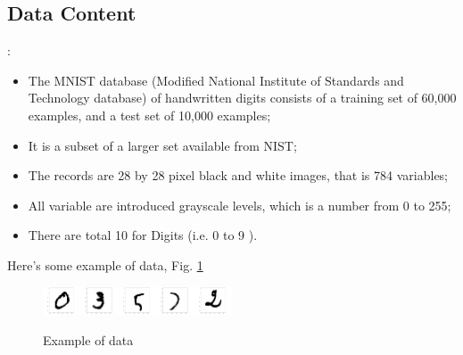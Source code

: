 \documentclass[8pt]{beamer}
\begin{document}
\subsection{Data Content}
\begin{frame}{\secname : \subsecname}
\begin{itemize}
  \item The MNIST database (Modified National Institute of Standards and Technology database) of handwritten digits consists of a training set of 60,000 examples, and a test set of 10,000 examples;
  \item It is a subset of a larger set available from NIST;
  \item The records are 28 by 28 pixel black and white images, that is 784 variables;
  \item All variable are introduced grayscale levels, which is a number from 0 to 255;
  \item There are total 10 for Digits (i.e. 0 to 9 ).
\end{itemize}
Here's some example of data, Fig. \ref{Example of data}
\begin{figure}[htbp]
\centerline{\includegraphics[width=0.1\textwidth]{figure/0.png}\includegraphics[width=0.1\textwidth]{figure/3.png}\includegraphics[width=0.1\textwidth]{figure/5.png}\includegraphics[width=0.1\textwidth]{figure/2.png}\includegraphics[width=0.1\textwidth]{figure/8.png}}
\caption{Example of data}
\label{Example of data}
\end{figure}
\end{frame}
\end{document}
